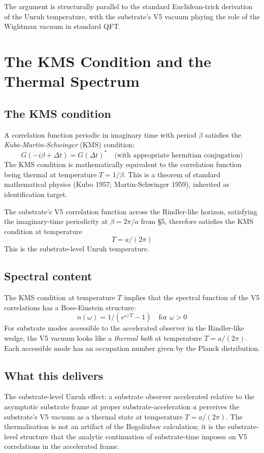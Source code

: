 \documentclass[11pt,a4paper]{article}
\begin{document}
The argument is structurally parallel to the standard Euclidean-trick derivation of the Unruh temperature, with the substrate's V5 vacuum playing the role of the Wightman vacuum in standard QFT.

\section{The KMS Condition and the Thermal Spectrum}

\subsection{The KMS condition}

A correlation function periodic in imaginary time with period $\beta$ satisfies the \emph{Kubo-Martin-Schwinger} (KMS) condition:
\[
G(-i\beta + \Delta t) = G(\Delta t)^* \quad \text{(with appropriate hermitian conjugation)}
\]
The KMS condition is mathematically equivalent to the correlation function being thermal at temperature $T = 1/\beta$. This is a theorem of standard mathematical physics (Kubo 1957; Martin-Schwinger 1959), inherited as identification target.

The substrate's V5 correlation function across the Rindler-like horizon, satisfying the imaginary-time periodicity at $\beta = 2\pi/a$ from \S5, therefore satisfies the KMS condition at temperature
\[
T = a / (2\pi)
\]
This is the substrate-level Unruh temperature.

\subsection{Spectral content}

The KMS condition at temperature $T$ implies that the spectral function of the V5 correlations has a Bose-Einstein structure:
\[
n(\omega) = 1 / (e^{\omega/T} - 1) \quad \text{for } \omega > 0
\]
For substrate modes accessible to the accelerated observer in the Rindler-like wedge, the V5 vacuum looks like a \emph{thermal bath} at temperature $T = a/(2\pi)$. Each accessible mode has an occupation number given by the Planck distribution.

\subsection{What this delivers}

The substrate-level Unruh effect: a substrate observer accelerated relative to the asymptotic substrate frame at proper substrate-acceleration $a$ perceives the substrate's V5 vacuum as a thermal state at temperature $T = a/(2\pi)$. The thermalisation is not an artifact of the Bogoliubov calculation; it is the substrate-level structure that the analytic continuation of substrate-time imposes on V5 correlations in the accelerated frame.
\end{document}

